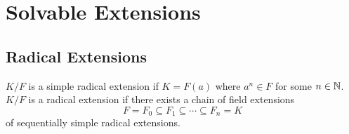 

\section{Solvable Extensions}

\subsection*{Radical Extensions}

\begin{definition}
    \(K/F\) is a simple radical extension if \(K = F(a)\)
    where \(a^n \in F\) for some \(n \in \mathbb{N}\).
    \(K/F\) is a radical extension if there exists a chain of field extensions
    \begin{equation*}
        F = F_0 \subseteq F_1 \subseteq \cdots \subseteq F_n = K
    \end{equation*}
    of sequentially simple radical extensions.
\end{definition}

